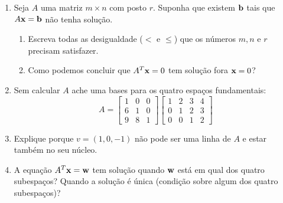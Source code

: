 \documentclass[leqno]{article}
\numberwithin{equation}{section}
\begin{document}
\begin{enumerate}

\item Seja $A$ uma matriz $m \times n$ com posto $r$. Suponha que existem $\mathbf{b}$ tais que $A \mathbf{x} = \mathbf{b}$ não tenha solução.

\begin{enumerate}

\item Escreva todas as desigualdade ($<$ e $\leq$) que os números $m,n$ e $r$ precisam satisfazer.

	\begin{sol} 
	\end{sol} 

\item Como podemos concluir que $A^T \mathbf{x} = 0$ tem solução fora $\mathbf{x} = 0$?

	\begin{sol} 
	\end{sol} 
\end{enumerate}

\item Sem calcular $A$ ache uma bases para os quatro espaços fundamentais:
$$A = \begin{bmatrix}
1 & 0 & 0 \\
6 & 1 & 0 \\
9 & 8 & 1
\end{bmatrix}
\begin{bmatrix}
1 & 2 & 3 & 4 \\
0 & 1 & 2 & 3 \\
0 & 0 & 1 & 2
\end{bmatrix}$$

\begin{sol} 
\end{sol} 

\item Explique porque $v = (1, 0, -1)$ não pode ser uma linha de $A$ e estar também no seu núcleo.

\begin{sol} 
\end{sol} 

\item A equação $A^T \mathbf{x} = \mathbf{w}$ tem solução quando $\mathbf{w}$ está em qual dos quatro subespaços? Quando a solução é única (condição sobre algum dos quatro subespaços)?

\begin{sol} 
\end{sol} 


\end{enumerate}
\end{document}
